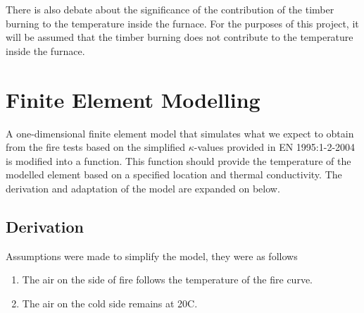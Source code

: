 	There is also debate about the significance of the contribution of the timber burning to the temperature inside the furnace. 
	For the purposes of this project, it will be assumed that the timber burning does not contribute to the temperature inside the furnace.
	
\section{Finite Element Modelling}\label{femexpl}
A one-dimensional finite element model that simulates what we expect to obtain from the fire tests based on the simplified $\kappa$-values provided in EN 1995:1-2-2004 is modified into a function.
This function should provide the temperature of the modelled element based on a specified location and thermal conductivity.
The derivation and adaptation of the model are expanded on below.
	\subsection{Derivation}%
	
	Assumptions were made to simplify the model, they were as follows
	\begin{enumerate}
\item{The air on the side of fire follows the temperature of the fire curve.}
\item{The air on the cold side remains at 20\textdegree C.}
	\end{enumerate}
